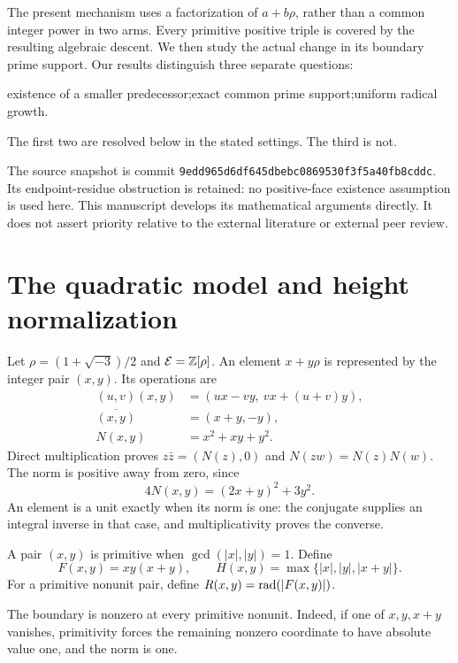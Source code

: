 The present mechanism uses a factorization of $a+b\rho$, rather than a common integer power in two arms. Every primitive positive triple is covered by the resulting algebraic descent. We then study the actual change in its boundary prime support. Our results distinguish three separate questions:
\begin{center}
existence of a smaller predecessor;\quad exact common prime support;\quad uniform radical growth.
\end{center}
The first two are resolved below in the stated settings. The third is not.

The source snapshot is commit \texttt{9edd965d6df645dbebc0869530f3f5a40fb8cddc}. Its endpoint-residue obstruction \cite{eisenstein:endpoint} is retained: no positive-face existence assumption is used here. This manuscript develops its mathematical arguments directly. It does not assert priority relative to the external literature or external peer review.

\section{The quadratic model and height normalization}
Let $\rho=(1+\sqrt{-3})/2$ and $\mathcal E=\mathbb Z[\rho]$. An element $x+y\rho$ is represented by the integer pair $(x,y)$. Its operations are
\begin{align}
(u,v)(x,y)&=(ux-vy,\ vx+(u+v)y),\label{eisenstein:eq:mul}\\
\overline{(x,y)}&=(x+y,-y),\\
N(x,y)&=x^2+xy+y^2.
\end{align}
Direct multiplication proves $z\bar z=(N(z),0)$ and $N(zw)=N(z)N(w)$. The norm is positive away from zero, since
\[
4N(x,y)=(2x+y)^2+3y^2.
\]
An element is a unit exactly when its norm is one: the conjugate supplies an integral inverse in that case, and multiplicativity proves the converse.

\begin{definition}
A pair $(x,y)$ is primitive when $\gcd(|x|,|y|)=1$. Define
\[
F(x,y)=xy(x+y),\qquad H(x,y)=\max\{|x|,|y|,|x+y|\}.
\]
For a primitive nonunit pair, define $R(x,y)=\operatorname{rad}(|F(x,y)|)$.
\end{definition}
The boundary is nonzero at every primitive nonunit. Indeed, if one of $x,y,x+y$ vanishes, primitivity forces the remaining nonzero coordinate to have absolute value one, and the norm is one.

